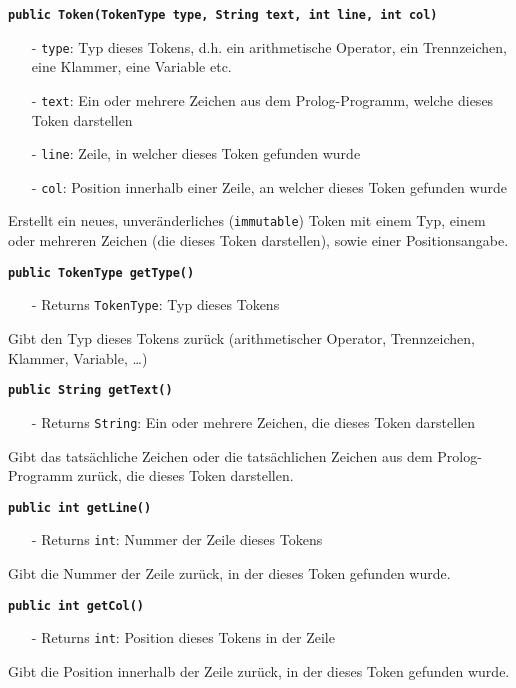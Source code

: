 \documentclass[parskip=full,11pt,twoside]{scrartcl}
\begin{document}
\textbf{\texttt{public Token(TokenType type, String text, int line, int col)}}
\begin{itemize}[noitemsep]
	\item[-] \texttt{type}: Typ dieses Tokens, d.h. ein arithmetische Operator, ein Trennzeichen, eine Klammer, eine Variable etc.
	\item[-] \texttt{text}: Ein oder mehrere Zeichen aus dem Prolog-Programm, welche dieses Token darstellen
	\item[-] \texttt{line}: Zeile, in welcher dieses Token gefunden wurde
	\item[-] \texttt{col}: Position innerhalb einer Zeile, an welcher dieses Token gefunden wurde
\end{itemize}
Erstellt ein neues, unveränderliches (\texttt{immutable}) Token mit einem Typ, einem oder mehreren Zeichen (die dieses Token darstellen), sowie einer Positionsangabe.

\textbf{\texttt{public TokenType getType()}}
\begin{itemize}[noitemsep]
	\item[-] Returns \texttt{TokenType}: Typ dieses Tokens
\end{itemize}
Gibt den Typ dieses Tokens zurück (arithmetischer Operator, Trennzeichen, Klammer, Variable, \dots)

\textbf{\texttt{public String getText()}}
\begin{itemize}[noitemsep]
	\item[-] Returns \texttt{String}: Ein oder mehrere Zeichen, die dieses Token darstellen
\end{itemize}
Gibt das tatsächliche Zeichen oder die tatsächlichen Zeichen aus dem Prolog-Programm zurück, die dieses Token darstellen.

\textbf{\texttt{public int getLine()}}
\begin{itemize}[noitemsep]
	\item[-] Returns \texttt{int}: Nummer der Zeile dieses Tokens
\end{itemize}
Gibt die Nummer der Zeile zurück, in der dieses Token gefunden wurde.

\textbf{\texttt{public int getCol()}}
\begin{itemize}[noitemsep]
	\item[-] Returns \texttt{int}: Position dieses Tokens in der Zeile
\end{itemize}
Gibt die Position innerhalb der Zeile zurück, in der dieses Token gefunden wurde.
\end{document}

